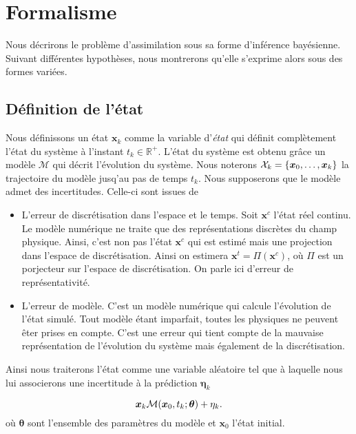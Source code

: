 \section{Formalisme}

Nous décrirons le problème d'assimilation sous sa forme d'inférence bayésienne. Suivant différentes hypothèses, nous montrerons qu'elle s'exprime alors sous des formes variées.

\subsection{Définition de l'état}
Nous définissons un état $\bm x_k$ comme la variable d'\textit{état} qui définit complètement l'état du système à l'instant $t_k \in \mathbb R^+$. L'état du système est obtenu grâce un modèle $\mathcal{M}$ qui décrit l'évolution du système.
Nous noterons $\mathcal X_k = \{\bm{x}_0, \dots, \bm{x}_k\}$ la trajectoire du modèle jusq'au pas de temps $t_k$.
Nous supposerons que le modèle admet des incertitudes. Celle-ci sont issues de

\begin{itemize}
    \item L'erreur de discrétisation dans l'espace et le temps. Soit $\bm x^c$ l'état réel continu. Le modèle numérique ne traite que des représentations discrètes du champ physique. Ainsi, c'est non pas l'état $\bm x^c$ qui est estimé mais une projection dans l'espace de discrétisation. Ainsi on estimera $\bm x^t = \Pi(\bm{x}^c)$, où $\Pi$ est un porjecteur sur l'espace de discrétisation. On parle ici d'erreur de représentativité.
    \item L'erreur de modèle. C'est un modèle numérique qui calcule l'évolution de l'état simulé. Tout modèle étant imparfait, toutes les physiques ne peuvent êter prises en compte. C'est une erreur qui tient compte de la mauvaise représentation de l'évolution du système mais également de la discrétisation.
\end{itemize}

Ainsi nous traiterons l'état comme une variable aléatoire tel que à laquelle nous lui associerons une incertitude à la prédiction $\bm \eta_k$

\begin{equation*}
    \bm x_k \mathcal{M}(\bm{x}_0, t_k ; \bm \theta) + \eta_k.
\end{equation*}
où $\bm \theta$ sont l'ensemble des paramètres du modèle et $\bm x_0$ l'état initial.

